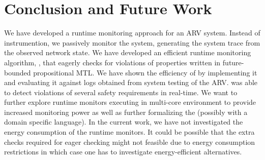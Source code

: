 
\section{Conclusion and Future Work}
We have developed a runtime monitoring approach for an ARV system.
Instead of instrumention, we passively monitor the system, generating the system trace from the observed network state.
We have developed an efficient runtime monitoring algorithm, \monitor, that eagerly checks for violations of properties written in future-bounded propositional MTL. We have shown the efficiency of \monitor by implementing it and evaluating it against logs obtained from system testing of the ARV.
\monitor was able to detect violations of several safety requirements in real-time.
We want to further explore runtime monitors executing in multi-core environment to provide increased monitoring power as well as further formalizing the \sfmap (possibly with a domain specific language).
In the current work, we have not investigated the energy consumption of the runtime monitors. It could be possible that the extra checks required for eager checking might not feasible due to energy consumption restrictions in which case one has to investigate energy-efficient alternatives.
